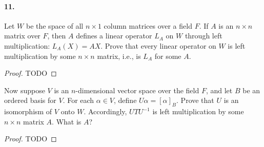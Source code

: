 \documentclass{article}
\begin{document}
\paragraph{11.} Let $W$ be the space of all $n \times 1$ column matrices over a
field $F$. If $A$ is an $n \times n$ matrix over $F$, then $A$ defines a linear
operator $L_A$ on $W$ through left multiplication: $L_A(X) = AX$. Prove that
every linear operator on $W$ is left multiplication by some $n \times n$ matrix,
i.e., is $L_A$ for some $A$.

\begin{proof}
  TODO
\end{proof}

Now suppose $V$ is an $n$-dimensional vector space over the field $F$, and let
$B$ be an ordered basis for $V$. For each $\alpha \in V$, define $U\alpha =
[\alpha]_B$. Prove that $U$ is an isomorphism of $V$ onto $W$. Accordingly,
$UTU^{-1}$ is left multiplication by some $n \times n$ matrix $A$. What is $A$?

\begin{proof}
  TODO
\end{proof}
\end{document}
